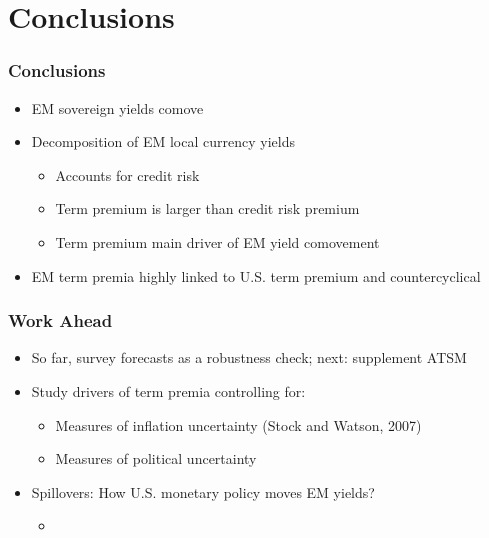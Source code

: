 \documentclass[12pt, aspectratio=169, xcolor=dvipsnames]{beamer} 			         %
\begin{document}
\section{Conclusions}

\begin{frame}
	\frametitle{Conclusions}
	\begin{itemize}
		\item EM sovereign yields comove
		\item Decomposition of EM local currency yields
		\begin{itemize}
			\item Accounts for credit risk
			\item Term premium is larger than credit risk premium
			\item Term premium main driver of EM yield comovement
		\end{itemize}
		\item EM term premia highly linked to U.S. term premium and countercyclical
	\end{itemize}
\end{frame}

\begin{frame}
	\frametitle{Work Ahead}
	\begin{itemize}
		\item So far, survey forecasts as a robustness check; next: supplement ATSM
		\item Study drivers of term premia controlling for:
		\begin{itemize}
			\item Measures of inflation uncertainty (Stock and Watson, 2007)
			\item Measures of political uncertainty \citep{BakerBloomDavis:2016}
		\end{itemize}
		\item Spillovers: How U.S. monetary policy moves EM yields?
		\begin{itemize}
			\item \cite{CurcuruKaminLiRodriguez:2018,ACDM:2019}
		\end{itemize}
	\end{itemize}
\end{frame}
\end{document}
